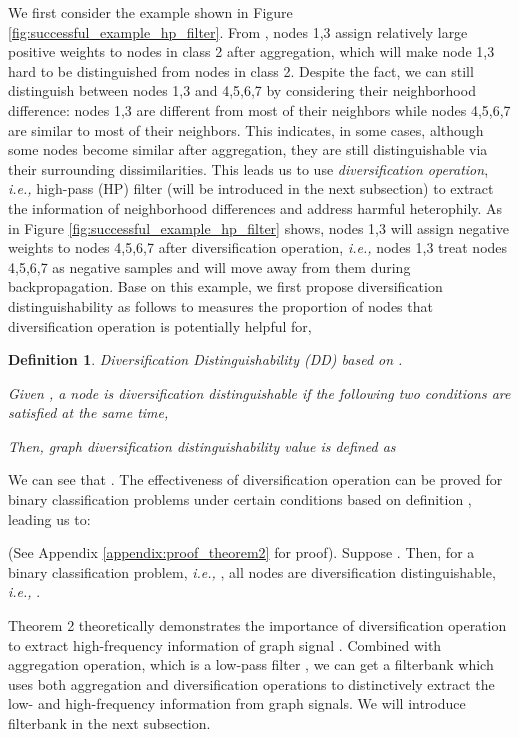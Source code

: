 \documentclass{article}
\newcommand\ie{\textit{i.e.,}}
\newcommand{\0}{{\boldsymbol{0}}}
\newcommand{\6}{{\partial}}
\newcommand{\8}{{\infty}}
\newcommand{\4}{{\nabla}}
\newenvironment{theorem}[2][Theorem]{\begin{trivlist}
		\item[\hskip \labelsep {\bfseries #1}\hskip \labelsep {\bfseries #2.}]}{\end{trivlist}}
\newtheorem{definition}{Definition}
\begin{document}
We first consider the example shown in Figure \ref{fig:successful_example_hp_filter}. From , nodes 1,3 assign relatively large positive weights to nodes in class 2 after aggregation, which will make node 1,3 hard to be distinguished from nodes in class 2. Despite the fact, we can still distinguish between nodes 1,3 and 4,5,6,7 by considering their neighborhood difference: nodes 1,3 are different from most of their neighbors while nodes 4,5,6,7 are similar to most of their neighbors. This indicates, in some cases, although some nodes become similar after aggregation, they are still distinguishable via their surrounding dissimilarities. This leads us to use \textit{diversification operation}, \ie{} high-pass (HP) filter  \cite{ekambaram2014graph} (will be introduced in the next subsection) to extract the information of neighborhood differences and address harmful heterophily. As  in Figure \ref{fig:successful_example_hp_filter} shows, nodes 1,3 will assign negative weights to nodes 4,5,6,7 after diversification operation, \ie{} nodes 1,3 treat nodes 4,5,6,7 as negative samples and will move away from them during backpropagation. Base on this example, we first propose diversification distinguishability as follows to measures the proportion of nodes that diversification operation is potentially helpful for, 
\begin{definition} Diversification Distinguishability (DD) based on .

Given , a node  is diversification distinguishable if the following two conditions are satisfied at the same time,
\vspace*{-1mm}

Then, graph diversification distinguishability value is defined as

\end{definition}
\vspace*{-1mm}
We can see that  . The effectiveness of diversification operation can be proved for binary classification problems under certain conditions based on definition , leading us to:
\begin{theorem} 2
(See Appendix \ref{appendix:proof_theorem2} for proof). 
Suppose .
Then, for a binary classification problem, \ie{} , all nodes are diversification distinguishable, \ie{} .
\end{theorem}
Theorem 2 theoretically demonstrates the importance of diversification operation to extract high-frequency information of graph signal \cite{ekambaram2014graph}. Combined with aggregation operation, which is a low-pass filter \cite{ekambaram2014graph,maehara2019revisiting}, we can get a filterbank which uses both aggregation and diversification operations to distinctively extract the low- and high-frequency information from graph signals. We will introduce filterbank in the next subsection.
\end{document}
